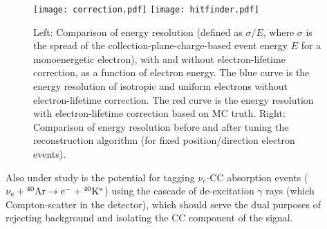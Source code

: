 %
\begin{figure}[!htb] %
 \centering
\texttt{[image: correction.pdf]} 
\texttt{[image: hitfinder.pdf]} 

 \caption[Comparisons of energy resolution]{Left: Comparison of energy
   resolution (defined as $\sigma/E$, where $\sigma$ is the spread of
   the collection-plane-charge-based event energy $E$ for a
   monoenergetic electron), with and without electron-lifetime
   correction, as a function of electron energy. The blue curve is the
   energy resolution of isotropic and uniform electrons without
   electron-lifetime correction. The red curve is the energy
   resolution with electron-lifetime correction based on MC truth.
   Right: Comparison of energy resolution before and after tuning the
   reconstruction algorithm (for fixed position/direction electron
   events).}\label{fig:lowe_res}
\end{figure}


Also under study is the potential for tagging $\nu_e$-CC absorption
events ($\nu_e +{}^{40}{\rm Ar} \rightarrow e^- +{}^{40}{\rm
  K^*}$) using the cascade of de-excitation $\gamma$ rays (which Compton-scatter in the detector), which should
serve the dual purposes of rejecting background and isolating the CC
component of the signal.  


